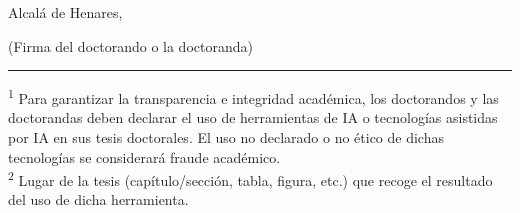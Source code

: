 \documentclass[10pt,a4paper,oneside]{article}
\begin{document}
\vfill
Alcalá de Henares, \PhDUnderline{6.0cm}{\myPaperworkDate}\\[1.15cm]
\begin{center}(Firma del doctorando o la doctoranda)\\[0.2cm]\myAuthorFullName\end{center}

\vfill
\hrule\vspace{0.12cm}
{\fontsize{7.2}{8.4}\selectfont
\textsuperscript{1} Para garantizar la transparencia e integridad académica, los doctorandos y las doctorandas deben declarar el uso de herramientas de IA o tecnologías asistidas por IA en sus tesis doctorales. El uso no declarado o no ético de dichas tecnologías se considerará fraude académico.\\[0.08cm]
\textsuperscript{2} Lugar de la tesis (capítulo/sección, tabla, figura, etc.) que recoge el resultado del uso de dicha herramienta.}
\end{document}
